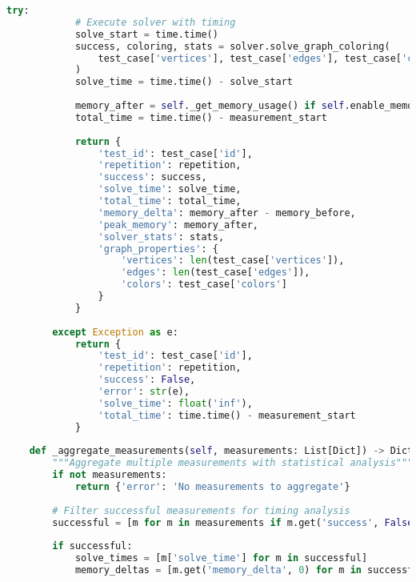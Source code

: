 \begin{lstlisting}[language=Python, caption=Performance Measurement Infrastructure]
        try:
            # Execute solver with timing
            solve_start = time.time()
            success, coloring, stats = solver.solve_graph_coloring(
                test_case['vertices'], test_case['edges'], test_case['colors']
            )
            solve_time = time.time() - solve_start
            
            memory_after = self._get_memory_usage() if self.enable_memory_profiling else 0
            total_time = time.time() - measurement_start
            
            return {
                'test_id': test_case['id'],
                'repetition': repetition,
                'success': success,
                'solve_time': solve_time,
                'total_time': total_time,
                'memory_delta': memory_after - memory_before,
                'peak_memory': memory_after,
                'solver_stats': stats,
                'graph_properties': {
                    'vertices': len(test_case['vertices']),
                    'edges': len(test_case['edges']),
                    'colors': test_case['colors']
                }
            }
            
        except Exception as e:
            return {
                'test_id': test_case['id'],
                'repetition': repetition,
                'success': False,
                'error': str(e),
                'solve_time': float('inf'),
                'total_time': time.time() - measurement_start
            }
    
    def _aggregate_measurements(self, measurements: List[Dict]) -> Dict:
        """Aggregate multiple measurements with statistical analysis"""
        if not measurements:
            return {'error': 'No measurements to aggregate'}
        
        # Filter successful measurements for timing analysis
        successful = [m for m in measurements if m.get('success', False)]
        
        if successful:
            solve_times = [m['solve_time'] for m in successful]
            memory_deltas = [m.get('memory_delta', 0) for m in successful]
            

\end{lstlisting}
